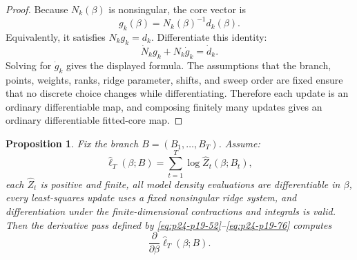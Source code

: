 \documentclass[11pt]{article}
\newtheorem{proposition}{Proposition}
\numberwithin{equation}{section}
\newcommand{\widehatell}{\widehat\ell}
\begin{document}
\begin{proof}
Because \(N_k(\beta)\) is nonsingular, the core vector is
\[
    g_k(\beta)=N_k(\beta)^{-1}d_k(\beta).
\]
Equivalently, it satisfies \(N_k g_k=d_k\).  Differentiate this identity:
\[
    \dot N_k g_k+N_k\dot g_k=\dot d_k.
\]
Solving for \(\dot g_k\) gives the displayed formula.  The assumptions that the
branch, points, weights, ranks, ridge parameter, shifts, and sweep order are
fixed ensure that no discrete choice changes while differentiating.  Therefore
each update is an ordinary differentiable map, and composing finitely many
updates gives an ordinary differentiable fitted-core map.
\end{proof}

\begin{proposition}
Fix the branch \(B=(B_1,\ldots,B_T)\).  Assume:
\begin{equation}
    \widehatell_T(\beta;B)=\sum_{t=1}^T\log\widehat Z_t(\beta;B_t),
    \label{eq:p24-p19-85}
\end{equation}
each \(\widehat Z_t\) is positive and finite, all model density evaluations are
differentiable in \(\beta\), every least-squares update uses a fixed
nonsingular ridge system, and differentiation under the finite-dimensional
contractions and integrals is valid.  Then the derivative pass defined by
\eqref{eq:p24-p19-52}--\eqref{eq:p24-p19-76} computes
\begin{equation}
    \frac{\partial}{\partial\beta}
    \widehatell_T(\beta;B).
    \label{eq:p24-p19-86}
\end{equation}
\end{proposition}
\end{document}
